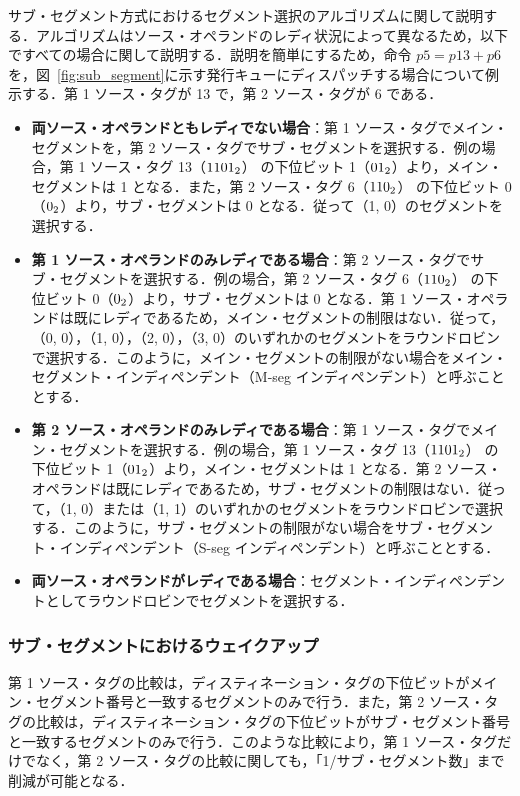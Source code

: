 \documentclass[submit,techrep,noauthor]{ipsj}
\newcommand{\fig}[1]{{図~\ref{fig:#1}}}
\begin{document}
サブ・セグメント方式におけるセグメント選択のアルゴリズムに関して説明する．アルゴリズムはソース・オペランドのレディ状況によって異なるため，以下ですべての場合に関して説明する．説明を簡単にするため，命令 $p5 = p13 + p6$ を，\fig{sub_segment}に示す発行キューにディスパッチする場合について例示する．第 1 ソース・タグが 13 で，第 2 ソース・タグが 6 である．
\begin{itemize}
  \item \textbf{両ソース・オペランドともレディでない場合}：第 1 ソース・タグでメイン・セグメントを，第 2 ソース・タグでサブ・セグメントを選択する．例の場合，第 1 ソース・タグ 13（${\rm 1101_2}$） の下位ビット 1（${\rm 01_2}$）より，メイン・セグメントは 1 となる．また，第 2 ソース・タグ 6（${\rm 110_2}$） の下位ビット 0（${\rm 0_2}$）より，サブ・セグメントは 0 となる．従って（1, 0）のセグメントを選択する． 
  \item \textbf{第 1 ソース・オペランドのみレディである場合}：第 2 ソース・タグでサブ・セグメントを選択する．例の場合，第 2 ソース・タグ 6（${\rm 110_2}$） の下位ビット 0（${\rm 0_2}$）より，サブ・セグメントは 0 となる．第 1 ソース・オペランドは既にレディであるため，メイン・セグメントの制限はない．従って，（0, 0），（1, 0），（2, 0），（3, 0）のいずれかのセグメントをラウンドロビンで選択する．このように，メイン・セグメントの制限がない場合をメイン・セグメント・インディペンデント（M-seg インディペンデント）と呼ぶこととする．
  \item \textbf{第 2 ソース・オペランドのみレディである場合}：第 1 ソース・タグでメイン・セグメントを選択する．例の場合，第 1 ソース・タグ 13（${\rm 1101_2}$） の下位ビット 1（${\rm 01_2}$）より，メイン・セグメントは 1 となる．第 2 ソース・オペランドは既にレディであるため，サブ・セグメントの制限はない．従って，（1, 0）または（1, 1）のいずれかのセグメントをラウンドロビンで選択する．このように，サブ・セグメントの制限がない場合をサブ・セグメント・インディペンデント（S-seg インディペンデント）と呼ぶこととする．
  \item \textbf{両ソース・オペランドがレディである場合}：セグメント・インディペンデントとしてラウンドロビンでセグメントを選択する．
\end{itemize}

\subsubsection{サブ・セグメントにおけるウェイクアップ}
第 1 ソース・タグの比較は，ディスティネーション・タグの下位ビットがメイン・セグメント番号と一致するセグメントのみで行う．また，第 2 ソース・タグの比較は，ディスティネーション・タグの下位ビットがサブ・セグメント番号と一致するセグメントのみで行う．このような比較により，第 1 ソース・タグだけでなく，第 2  ソース・タグの比較に関しても，「1/サブ・セグメント数」まで削減が可能となる．
\end{document}
